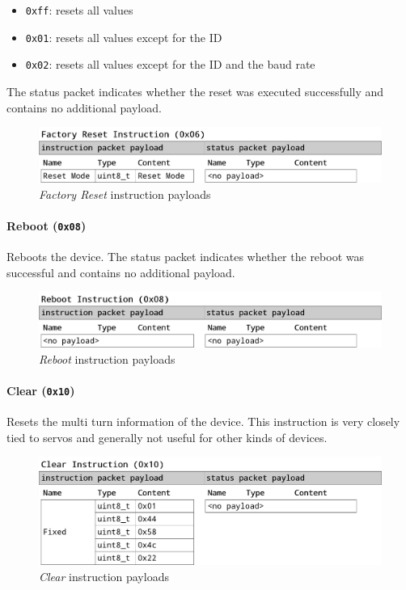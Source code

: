 \begin{itemize}
    \item \lstinline{0xff}: resets all values
    \item \lstinline{0x01}: resets all values except for the ID
    \item \lstinline{0x02}: resets all values except for the ID and the baud rate
\end{itemize}

The status packet indicates whether the reset was executed successfully and contains no additional
payload.

\begin{figure}[H]
    \centering
    \includegraphics[scale=0.2]{img/factory_reset_packet.png}
    \caption{\textit{Factory Reset} instruction payloads}
\end{figure}

\paragraph{Reboot (\lstinline{0x08})}

Reboots the device. The status packet indicates whether the reboot was successful and contains no
additional payload.

\begin{figure}[H]
    \centering
    \includegraphics[scale=0.2]{img/reboot_packet.png}
    \caption{\textit{Reboot} instruction payloads}
\end{figure}

\paragraph{Clear (\lstinline{0x10})}

Resets the multi turn information of the device. This instruction is very closely tied to servos
and generally not useful for other kinds of devices.

\begin{figure}[H]
    \centering
    \includegraphics[scale=0.2]{img/clear_packet.png}
    \caption{\textit{Clear} instruction payloads}
\end{figure}

